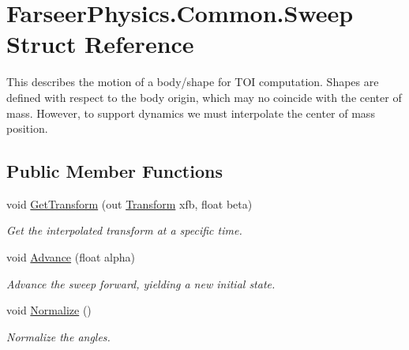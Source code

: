 \hypertarget{struct_farseer_physics_1_1_common_1_1_sweep}{\section{Farseer\+Physics.\+Common.\+Sweep Struct Reference}
\label{struct_farseer_physics_1_1_common_1_1_sweep}
}


This describes the motion of a body/shape for T\+O\+I computation. Shapes are defined with respect to the body origin, which may no coincide with the center of mass. However, to support dynamics we must interpolate the center of mass position.  


\subsection*{Public Member Functions}
\begin{DoxyCompactItemize}
\item 
void \hyperlink{struct_farseer_physics_1_1_common_1_1_sweep_a0ed4ddcfd0398f7d0c74ff692d9b431f}{Get\+Transform} (out \hyperlink{struct_farseer_physics_1_1_common_1_1_transform}{Transform} xfb, float beta)
\begin{DoxyCompactList}\small\item\em Get the interpolated transform at a specific time. \end{DoxyCompactList}\item 
void \hyperlink{struct_farseer_physics_1_1_common_1_1_sweep_a7693bdf7a0615769d35aeb91492c7cc2}{Advance} (float alpha)
\begin{DoxyCompactList}\small\item\em Advance the sweep forward, yielding a new initial state. \end{DoxyCompactList}\item 
void \hyperlink{struct_farseer_physics_1_1_common_1_1_sweep_a43654ebfe3ba9b7067a63743774184a6}{Normalize} ()
\begin{DoxyCompactList}\small\item\em Normalize the angles. \end{DoxyCompactList}\end{DoxyCompactItemize}
